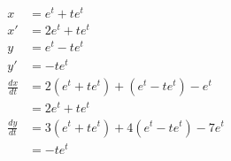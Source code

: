 \documentclass{article}
\begin{document}
\setcounter{subsubsection}{22}
\subsubsection{}

\begin{align*}
  x               & = e^t + t e^t                               \\
  x'              & = 2 e^t + t e^t                             \\
  y               & = e^t - t e^t                               \\
  y'              & = - t e^t                                   \\
  \frac{d x}{d t} & = 2 (e^t + t e^t) + (e^t - t e^t) - e^t     \\
                  & = 2 e^t + t e^t                             \\
  \frac{d y}{d t} & = 3 (e^t + t e^t) + 4 (e^t - t e^t) - 7 e^t \\
                  & = -t e^t
\end{align*}
\end{document}
